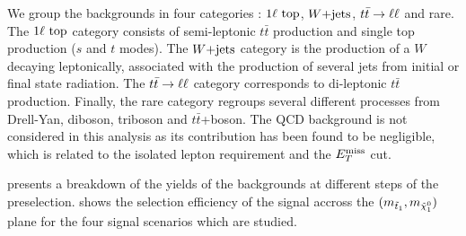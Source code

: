        We group the backgrounds in four categories : $1\ell~\text{top}$, $\text{$W$+jets}$, $t\bar{t} \rightarrow \ell \ell$
        and rare. The $1\ell~\text{top}$ category consists of semi-leptonic $t\bar{t}$
        production and single top production ($s$ and $t$ modes). The $\text{$W$+jets}$
        category is the production of a $W$ decaying leptonically, associated with the
        production of several jets from initial or final state radiation. The $t\bar{t} \rightarrow \ell \ell$
        category corresponds to di-leptonic $t\bar{t}$ production. Finally, the rare
        category regroups several different processes from Drell-Yan, diboson, triboson and
        $t\bar{t}$+boson. The QCD background is not considered in this analysis as its
        contribution has been found to be negligible, which is related to the
        isolated lepton requirement and the $E_T^\text{miss}$ cut.

         presents a breakdown of the yields of the backgrounds
        at different steps of the preselection.  shows
        the selection efficiency of the signal accross the $(m_{\tilde{t}_1}, m_{\tilde{\chi}_1^0})$
        plane for the four signal scenarios which are studied.

